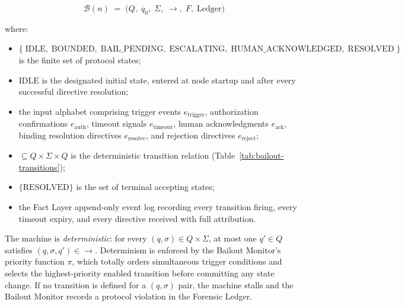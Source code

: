 \begin{equation}
\mathcal{B}(n) \;=\; \bigl( Q,\; q_0,\; \Sigma,\; \rightarrow,\; F,\; \text{Ledger} \bigr)
\label{eq:bailout-fsm}
\end{equation}

where:

\begin{itemize}\itemsep=0pt
\item[$Q$] $\{\; \text{IDLE},\; \text{BOUNDED},\; \text{BAIL\_PENDING},\; \text{ESCALATING},\; \text{HUMAN\_ACKNOWLEDGED},\; \text{RESOLVED}\; \}$ is the finite set of protocol states;
\item[$q_0$] $\text{IDLE}$ is the designated initial state, entered at node startup and after every successful directive resolution;
\item[$\Sigma$] the input alphabet comprising trigger events $e_{\text{trigger}}$, authorization confirmations $e_{\text{auth}}$, timeout signals $e_{\text{timeout}}$, human acknowledgments $e_{\text{ack}}$, binding resolution directives $e_{\text{resolve}}$, and rejection directives $e_{\text{reject}}$;
\item[$\rightarrow$] $\subseteq Q \times \Sigma \times Q$ is the deterministic transition relation (Table~\ref{tab:bailout-transitions});
\item[$F$] $\{\text{RESOLVED}\}$ is the set of terminal accepting states;
\item[$\text{Ledger}$] the Fact Layer append-only event log recording every transition firing, every timeout expiry, and every directive received with full attribution.
\end{itemize}

The machine is \emph{deterministic}: for every $(q, \sigma) \in Q \times \Sigma$, at most one $q' \in Q$ satisfies $(q, \sigma, q') \in \rightarrow$. Determinism is enforced by the Bailout Monitor's priority function $\pi$, which totally orders simultaneous trigger conditions and selects the highest-priority enabled transition before committing any state change. If no transition is defined for a $(q, \sigma)$ pair, the machine stalls and the Bailout Monitor records a protocol violation in the Forensic Ledger.

